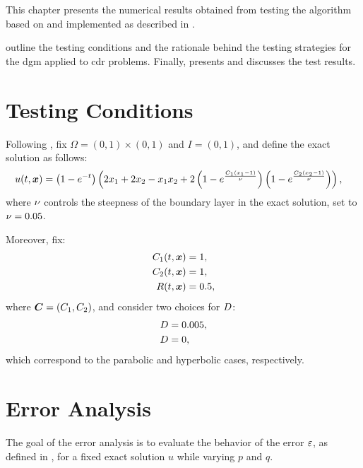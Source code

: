 This chapter presents the numerical results obtained from testing the algorithm based on  and implemented as described in .

 outline the testing conditions and the rationale behind the testing strategies for the \acrshort{dgm} applied to \acrshort{cdr} problems. Finally,  presents and discusses the test results.

\newpage
\section{Testing Conditions} \label{sec:tests}

Following \cite{Feistauer2007}, fix $\Omega = \left( 0, 1 \right) \times \left( 0, 1 \right)$ and $I = \left( 0, 1 \right)$, and define the exact solution as follows:
\begin{align}
    u(t, \bm{x}) &= \left( 1 - e^{-t} \right) \left( 2 x_1 + 2 x_2 - x_1 x_2 + 2 \left( 1 - e^{\frac{C_1 \left( x_1 - 1 \right) }{\nu}} \right) \left( 1 - e^{\frac{C_2 \left( x_2 - 1 \right) }{\nu}} \right) \right), \label{eq:u_test_exact}
\end{align}
where $\nu$ controls the steepness of the boundary layer in the exact solution, set to $\nu = 0.05$.

Moreover, fix:
\begin{align}
    C_1(t, \bm{x}) &= 1, \\
    C_2(t, \bm{x}) &= 1, \\
    R(t, \bm{x}) &= 0.5,
\end{align}
where $\bm{C} = \left( C_1, C_2 \right)$, and consider two choices for $D$:
\begin{align}
    D &= 0.005, \\
    D &= 0,
\end{align}
which correspond to the parabolic and hyperbolic cases, respectively.

\section{Error Analysis} \label{section:error_results}

The goal of the error analysis is to evaluate the behavior of the error $\varepsilon$, as defined in , for a fixed exact solution $u$ while varying $p$ and $q$.

